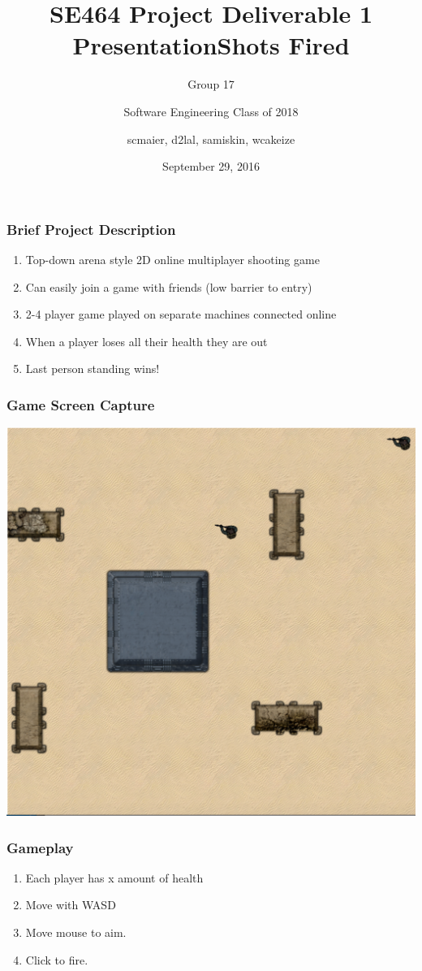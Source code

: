 \documentclass{beamer}
\title%
{SE464 Project Deliverable 1 Presentation}
\subtitle{Group 17}
\author[SE2018] %
{Software Engineering Class of 2018}
\institute[UW] %
{
  University of Waterloo
}
\date%
{September 29, 2016}
\title{Shots Fired}
\author{scmaier, d2lal, samiskin, wcakeize}
\begin{document}
\maketitle
\begin{frame}
\frametitle{Brief Project Description}
\begin{enumerate}
  \item Top-down arena style 2D online multiplayer shooting game
  \item Can easily join a game with friends (low barrier to entry)
  \item 2-4 player game played on separate machines connected online
  \item When a player loses all their health they are out
  \item Last person standing wins!
\end{enumerate}
\end{frame}

\begin{frame}
\frametitle{Game Screen Capture}
\centering
\includegraphics[scale=0.3]{images/gamescreenshot.png}
\end{frame}

\begin{frame}
\frametitle{Gameplay}
\begin{enumerate}
  \item Each player has x amount of health
  \item Move with WASD
  \item Move mouse to aim.
  \item Click to fire.
\end{enumerate}
\end{frame}
\end{document}
